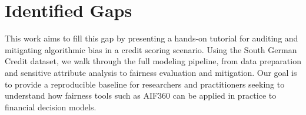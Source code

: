 \section{Identified Gaps}
This work aims to fill this gap by presenting a hands-on tutorial for auditing and mitigating algorithmic bias in a credit scoring scenario. Using the South German Credit dataset, we walk through the full modeling pipeline, from data preparation and sensitive attribute analysis to fairness evaluation and mitigation. Our goal is to provide a reproducible baseline for researchers and practitioners seeking to understand how fairness tools such as AIF360 can be applied in practice to financial decision models.
